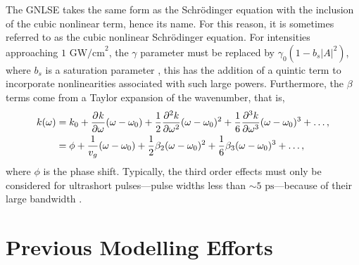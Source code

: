 The GNLSE takes the same form as the Schr\"odinger equation with the inclusion of the cubic nonlinear term, hence its name. For this reason, it is sometimes referred to as the cubic nonlinear Schr\"odinger equation. For intensities approaching $1 \text{ GW/cm}^2$, the $\gamma$ parameter must be replaced by $\gamma_0 (1 - b_s |A|^2)$, where $b_s$ is a saturation parameter \cite{agrawal2013}, this has the addition of a quintic term to incorporate nonlinearities associated with such large powers. Furthermore, the $\beta$ terms come from a Taylor expansion of the wavenumber, that is,
\begin{align*}
k(\omega) &= k_0 + \pdiff{k}{\omega}(\omega - \omega_0) + \frac{1}{2} \pdiff[2]{k}{\omega}(\omega - \omega_0)^2 + \frac{1}{6} \pdiff[3]{k}{\omega}(\omega - \omega_0)^3 + \dots, \\
&= \phi + \frac{1}{v_g}(\omega - \omega_0) + \frac{1}{2}\beta_2 (\omega - \omega_0)^2 + \frac{1}{6}\beta_3 (\omega - \omega_0)^3 + \dots,
\end{align*}
where $\phi$ is the phase shift. Typically, the third order effects must only be considered for ultrashort pulses---pulse widths less than $\sim5 \text{ ps}$---because of their large bandwidth \cite{agrawal2013}.

\section{Previous Modelling Efforts}

